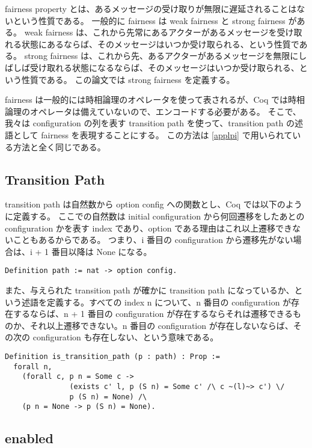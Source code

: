 
fairness property とは、あるメッセージの受け取りが無限に遅延されることはないという性質である。
一般的に fairness は weak fairness と strong fairness がある。
weak fairness は、これから先常にあるアクターがあるメッセージを受け取れる状態にあるならば、そのメッセージはいつか受け取られる、という性質である。
strong fairness は、これから先、あるアクターがあるメッセージを無限にしばしば受け取れる状態になるならば、そのメッセージはいつか受け取られる、という性質である。
この論文では strong fairness を定義する。

fairness は一般的には時相論理のオペレータを使って表されるが、Coq では時相論理のオペレータは備えていないので、エンコードする必要がある。
そこで、我々は configuration の列を表す transition path を使って、transition path の述語として fairness を表現することにする。
この方法は \ref{applpi} で用いられている方法と全く同じである。

\subsection{Transition Path}
transition path は自然数から option config への関数とし、Coq では以下のように定義する。
ここでの自然数は initial configuration から何回遷移をしたあとの configuration かを表す index であり、option である理由はこれ以上遷移できないこともあるからである。
つまり、i 番目の configuration から遷移先がない場合は、i + 1 番目以降は None になる。

\begin{lstlisting}
Definition path := nat -> option config.
\end{lstlisting}

また、与えられた transition path が確かに transition path になっているか、という述語を定義する。すべての index n について、n 番目の configuration が存在するならば、n + 1 番目の configuration が存在するならそれは遷移できるものか、それ以上遷移できない。n 番目の configuration が存在しないならば、その次の configuration も存在しない、という意味である。

\begin{lstlisting}
Definition is_transition_path (p : path) : Prop :=
  forall n,
    (forall c, p n = Some c ->
               (exists c' l, p (S n) = Some c' /\ c ~(l)~> c') \/
               p (S n) = None) /\
    (p n = None -> p (S n) = None).
\end{lstlisting}

\subsection{enabled}

